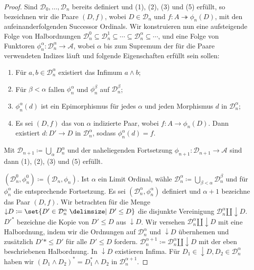 \documentclass[a4paper, parskip=half]{scrartcl}
\theoremstyle{marginbreak}
\theoremstyle{nonumberplain}
\newtheorem{proof}{Beweis.}
\newcommand\cat\mathcal
\newcommand{\down}[1]{{\downarrow}#1}
\begin{document}
{\begin{proof}
			Sind $\cat{D}_0,\ldots,\cat{D}_n$ bereits definiert und (1), (2), (3)
			und (5) erfüllt, so bezeichnen wir die Paare $(D, f)$, wobei $D\in\cat{D}_n$
			und $f\colon A\twoheadrightarrow \phi_n(D)$, mit den aufeinanderfolgenden
			Successor Ordinals. Wir konstruieren nun eine aufsteigende Folge von
			Halbordnungen $\cat{D}_n^0\subseteq\cat{D}_n^1\subseteq\cdots\subseteq\cat{D}_n^\alpha\subseteq\cdots$,
			und eine Folge von Funktoren $\phi_n^\alpha\colon\cat{D}_n^\alpha\to\cat{A}$,
			wobei $\alpha$ bis zum Supremum der für die Paare verwendeten Indizes läuft und
			folgende Eigenschaften erfüllt sein sollen:
			\begin{enumerate}[label=(\alph*),noitemsep]
				\item Für $a, b\in\cat{D}_n^\alpha$ existiert das Infimum $a\wedge b$;
				\item Für $\beta<\alpha$ fallen $\phi_n^\alpha$ und $\phi_n^\beta$ auf $\cat{D}_n^\beta$;
				\item $\phi_n^\alpha(d)$ ist ein Epimorphismus für jedes $\alpha$ und jeden
					Morphismus $d$ in $\cat{D}_n^\alpha$;
				\item Es sei $(D, f)$ das von $\alpha$ indizierte Paar, wobei
					$f\colon A\to\phi_n(D)$. Dann existiert $d\colon D'\to D$ in
					$\cat{D}_n^\alpha$, sodass $\phi_n^\alpha(d) = f$.
			\end{enumerate}
			Mit $\cat{D}_{n+1}\coloneqq\bigcup_\alpha D_n^\alpha$ und der naheliegenden
			Fortsetzung $\phi_{n+1}\colon\cat{D}_{n+1}\to\cat{A}$ sind dann (1), (2), (3)
			und (5) erfüllt.

			$(\cat{D}_n^0, \phi_n^0)\coloneqq (\cat{D}_n, \phi_n)$. Ist $\alpha$ ein
			Limit Ordinal, wähle $\cat{D}_n^\alpha\coloneqq\bigcup_{\beta<\alpha}\cat{D}_n^\beta$
			und für $\phi_n^\alpha$ die entsprechende Fortsetzung. Es sei $(\cat{D}_n^\alpha,
			\phi_n^\alpha)$ definiert und $\alpha+1$ bezeichne das Paar $(D, f)$.
			Wir betrachten für die Menge $\down{D}\coloneqq\set{D'\in\cat{D}_n^\alpha\given D'\leq D}$
			die disjunkte Vereinigung $\cat{D}_n^\alpha\amalg\down{D}$. $D'^*$
			bezeichne die Kopie von $D'\leq D$ aus $\down{D}$. Wir versehen
			$\cat{D}_n^\alpha\amalg\down{D}$ mit eine Halbordnung, indem wir die
			Ordnungen auf $\cat{D}_n^\alpha$ und $\down{D}$ übernhemen und zusätzlich
			$D'*\leq D'$ für alle $D'\leq D$ fordern. $\cat{D}_n^{\alpha+1}\coloneqq
			\cat{D}_n^\alpha\amalg\down{D}$ mit der eben beschriebenen Halbordnung.
			In $\down{D}$ existieren Infima. Für $D_1\in\down{D}, D_2\in\cat{D}_n^\alpha$
			haben wir $(D_1\wedge D_2)^*=D_1^*\wedge D_2$ in $\cat{D}_n^{\alpha+1}$.


\end{proof}}
\end{document}
